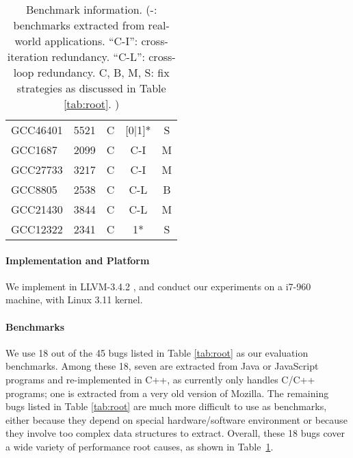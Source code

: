 \begin{table}
\begin{tabular}{lcccc}
   \midrule
   GCC46401              & 5521            & C                      &  [0$|$1]*    & S   \\
   GCC1687               & 2099            & C                      &  C-I         & M \\
   GCC27733              & 3217            & C                      &  C-I         & M \\
   GCC8805               & 2538            & C                      &  C-L         & B\\
   GCC21430              & 3844            & C                      &  C-L         & M \\
   GCC12322              & 2341            & C                      &  1*          & S\\
\bottomrule
   \end{tabular}
  \caption{Benchmark information.
  (-: benchmarks extracted from real-world applications.
  ``C-I'': cross-iteration redundancy.
  ``C-L'': cross-loop redundancy.
  C, B, M, S: fix strategies as discussed in
  Table \ref{tab:root}.
  ) 
 }
  \label{tab:benchmarks}
\end{table}

\paragraph{Implementation and Platform}
We implement \Tool in LLVM-3.4.2 \cite{llvm}, and conduct our
experiments on a i7-960 machine, with Linux 3.11 kernel. 

\paragraph{Benchmarks}
We use 18 out of the 45 bugs listed in Table \ref{tab:root} as our 
evaluation benchmarks. Among these 18, seven are extracted from Java or JavaScript
programs and re-implemented in C++, as \Tool currently only handles C/C++
programs; one is extracted from a very old version of Mozilla.
The remaining bugs listed in Table \ref{tab:root} are much more difficult to
use as benchmarks, 
either because they depend on special hardware/software environment
or because they involve too complex data structures to extract. 
Overall, these 18 bugs cover a wide variety of performance root causes, as 
shown in Table~\ref{tab:benchmarks}. 

